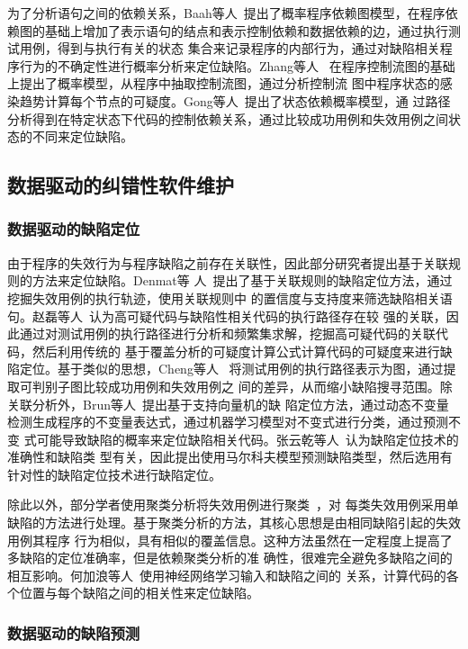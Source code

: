 为了分析语句之间的依赖关系，Baah等人~\cite{baah2010probabilistic}提出了概率程序依赖图模型，在程序依
赖图的基础上增加了表示语句的结点和表示控制依赖和数据依赖的边，通过执行测试用例，得到与执行有关的状态
集合来记录程序的内部行为，通过对缺陷相关程序行为的不确定性进行概率分析来定位缺陷。Zhang等人
~\cite{zhang2009capturing}在程序控制流图的基础上提出了概率模型，从程序中抽取控制流图，通过分析控制流
图中程序状态的感染趋势计算每个节点的可疑度。Gong等人~\cite{gong2015state}提出了状态依赖概率模型，通
过路径分析得到在特定状态下代码的控制依赖关系，通过比较成功用例和失效用例之间状态的不同来定位缺陷。

\subsection{数据驱动的纠错性软件维护}

\subsubsection{数据驱动的缺陷定位}
由于程序的失效行为与程序缺陷之前存在关联性，因此部分研究者提出基于关联规则的方法来定位缺陷。Denmat等
人~\cite{denmat2005data}提出了基于关联规则的缺陷定位方法，通过挖掘失效用例的执行轨迹，使用关联规则中
的置信度与支持度来筛选缺陷相关语句。赵磊等人~\cite{zl}认为高可疑代码与缺陷性相关代码的执行路径存在较
强的关联，因此通过对测试用例的执行路径进行分析和频繁集求解，挖掘高可疑代码的关联代码，然后利用传统的
基于覆盖分析的可疑度计算公式计算代码的可疑度来进行缺陷定位。基于类似的思想，Cheng等人
~\cite{cheng2009identifying}将测试用例的执行路径表示为图，通过提取可判别子图比较成功用例和失效用例之
间的差异，从而缩小缺陷搜寻范围。除关联分析外，Brun等人~\cite{brun2004finding}提出基于支持向量机的缺
陷定位方法，通过动态不变量检测生成程序的不变量表达式，通过机器学习模型对不变式进行分类，通过预测不变
式可能导致缺陷的概率来定位缺陷相关代码。张云乾等人~\cite{malcov2013}认为缺陷定位技术的准确性和缺陷类
型有关，因此提出使用马尔科夫模型预测缺陷类型，然后选用有针对性的缺陷定位技术进行缺陷定位。

除此以外，部分学者使用聚类分析将失效用例进行聚类~\cite{jones2007debugging, zheng2006statistical}，对
每类失效用例采用单缺陷的方法进行处理。基于聚类分析的方法，其核心思想是由相同缺陷引起的失效用例其程序
行为相似，具有相似的覆盖信息。这种方法虽然在一定程度上提高了多缺陷的定位准确率，但是依赖聚类分析的准
确性，很难完全避免多缺陷之间的相互影响。何加浪等人~\cite{neural2013}使用神经网络学习输入和缺陷之间的
关系，计算代码的各个位置与每个缺陷之间的相关性来定位缺陷。

\subsubsection{数据驱动的缺陷预测}

